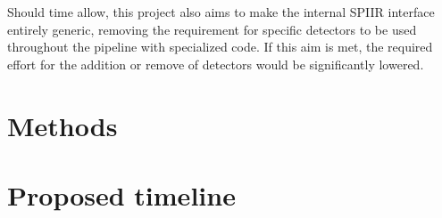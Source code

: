 \documentclass{article}
\begin{document}
Should time allow, this project also aims to make the internal SPIIR interface entirely generic,
removing the requirement for specific detectors to be used throughout the pipeline with specialized
code. If this aim is met, the required effort for the addition or remove of detectors would be
significantly lowered.

\section{Methods}
\section{Proposed timeline}
\end{document}

